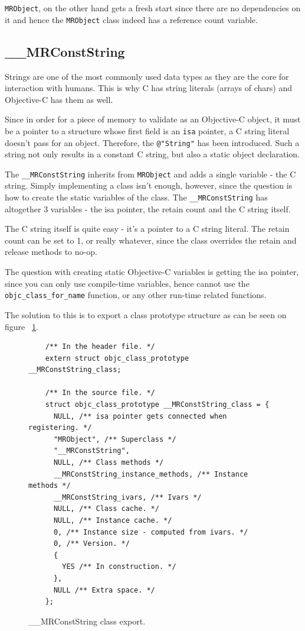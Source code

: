 \verb=MRObject=, on the other hand gets a fresh start since there are no dependencies on it and hence the \verb=MRObject= class indeed has a reference count variable.

\subsection{\_\_MRConstString}

Strings are one of the most commonly used data types as they are the core for interaction with humans. This is why C has string literals (arrays of chars) and Objective-C has them as well.

Since in order for a piece of memory to validate as an Objective-C object, it must be a pointer to a structure whose first field is an \verb=isa= pointer, a C string literal doesn't pass for an object. Therefore, the \verb=@"String"= has been introduced. Such a string not only results in a constant C string, but also a static object declaration.

The \verb=__MRConstString= inherits from \verb=MRObject= and adds a single variable - the C string. Simply implementing a class isn't enough, however, since the question is how to create the static variables of the class. The \verb=__MRConstString= has altogether 3 variables - the isa pointer, the retain count and the C string itself.

The C string itself is quite easy - it's a pointer to a C string literal. The retain count can be set to 1, or really whatever, since the class overrides the retain and release methods to no-op.

The question with creating static Objective-C variables is getting the isa pointer, since you can only use compile-time variables, hence cannot use the \verb=objc_class_for_name= function, or any other run-time related functions.

The solution to this is to export a class prototype structure as can be seen on figure ~\ref{fig:mr_const_str_export}.

\begin{figure}[H]
  \begin{verbatim}
    /** In the header file. */
    extern struct objc_class_prototype __MRConstString_class;
    
    /** In the source file. */
    struct objc_class_prototype __MRConstString_class = {
      NULL, /** isa pointer gets connected when registering. */
      "MRObject", /** Superclass */
      "__MRConstString",
      NULL, /** Class methods */
      __MRConstString_instance_methods, /** Instance methods */
      __MRConstString_ivars, /** Ivars */
      NULL, /** Class cache. */
      NULL, /** Instance cache. */
      0, /** Instance size - computed from ivars. */
      0, /** Version. */
      {
        YES /** In construction. */
      },
      NULL /** Extra space. */
    };
  \end{verbatim}
  \centering{}
  \caption{\_\_MRConstString class export.}
  \label{fig:mr_const_str_export}
\end{figure}

